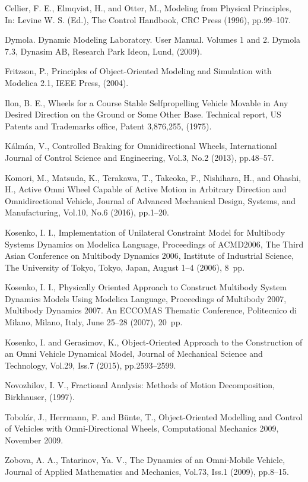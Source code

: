 \documentclass{jsme-tj}
\begin{document}
\begin{thebibliography}{99}

Cellier, F. E., Elmqvist, H., and Otter, M., Modeling from Physical Principles, 
In: Levine W. S. (Ed.), The Control Handbook, CRC Press (1996), pp.99--107.

Dymola. Dynamic Modeling Laboratory. User Manual. Volumes 1 and 2. Dymola 7.3, 
Dynasim AB, Research Park Ideon, Lund, (2009).

Fritzson, P., Principles of Object-Oriented Modeling and Simulation with 
Modelica 2.1, IEEE Press, (2004).

Ilon, B. E., Wheels for a Course Stable Selfpropelling Vehicle Movable in Any
Desired Direction on the Ground or Some Other Base. Technical report, US 
Patents and Trademarks office, Patent 3,876,255, (1975).

K\'alm\'an, V., Controlled Braking for Omnidirectional Wheels, International 
Journal of Control Science and Engineering, Vol.3, No.2 (2013), pp.48--57.

Komori, M., Matsuda, K., Terakawa, T., Takeoka, F., Nishihara, H., and Ohashi, 
H., Active Omni Wheel Capable of Active Motion in Arbitrary Direction and 
Omnidirectional Vehicle, Journal of Advanced Mechanical Design, Systems, and 
Manufacturing,  Vol.10, No.6 (2016), pp.1--20.

Kosenko, I. I., Implementation of Unilateral Constraint Model for Multibody 
Systems Dynamics on Modelica Language, Proceedings of ACMD2006, The Third Asian 
Conference on Multibody Dynamics 2006, Institute of Industrial Science, The 
University of Tokyo, Tokyo, Japan, August 1--4 (2006), 8~pp.

Kosenko, I. I., Physically Oriented Approach to Construct Multibody System 
Dynamics Models Using Modelica Language, Proceedings of Multibody 2007, 
Multibody Dynamics 2007. An ECCOMAS Thematic Conference, Politecnico di Milano, 
Milano, Italy, June 25--28 (2007), 20~pp.

Kosenko, I. and Gerasimov, K., Object-Oriented Approach to the Construction of 
an Omni Vehicle Dynamical Model, Journal of Mechanical Science and Technology, 
Vol.29, Iss.7 (2015), pp.2593--2599.

Novozhilov, I. V., Fractional Analysis: Methods of Motion Decomposition,
Birkhauser, (1997).

Tobol\'ar, J., Herrmann, F. and B\"unte, T., Object-Oriented Modelling and 
Control of Vehicles with Omni-Directional Wheels, Computational Mechanics 2009, 
November 2009.

Zobova, A. A., Tatarinov, Ya. V., The Dynamics of an Omni-Mobile Vehicle, 
Journal of Applied Mathematics and Mechanics, Vol.73, Iss.1 (2009), pp.8--15.

\end{thebibliography}
\end{document}
